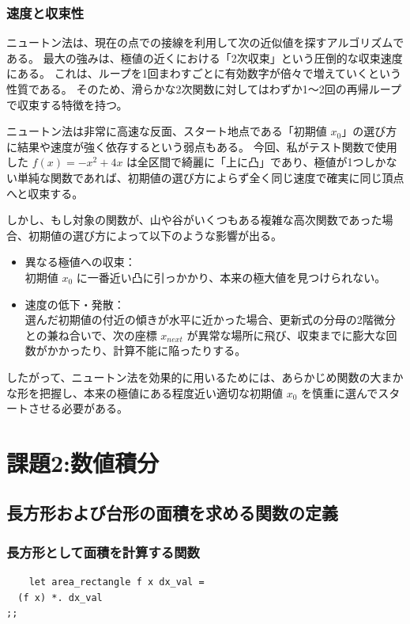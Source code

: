 \documentclass[titlepage]{ltjsarticle}
\begin{document}
\subsubsection{速度と収束性}
ニュートン法は、現在の点での接線を利用して次の近似値を探すアルゴリズムである。
最大の強みは、極値の近くにおける「2次収束」という圧倒的な収束速度にある。
これは、ループを1回まわすごとに有効数字が倍々で増えていくという性質である。
そのため、滑らかな2次関数に対してはわずか1〜2回の再帰ループで収束する特徴を持つ。
\par
ニュートン法は非常に高速な反面、スタート地点である「初期値 $x_0$」の選び方に結果や速度が強く依存するという弱点もある。
今回、私がテスト関数で使用した $f(x) = -x^2 + 4x$ は全区間で綺麗に「上に凸」であり、極値が1つしかない単純な関数であれば、初期値の選び方によらず全く同じ速度で確実に同じ頂点へと収束する。

しかし、もし対象の関数が、山や谷がいくつもある複雑な高次関数であった場合、初期値の選び方によって以下のような影響が出る。
\begin{itemize}
    \item 異なる極値への収束：\\
    初期値 $x_0$ に一番近い凸に引っかかり、本来の極大値を見つけられない。
    \item 速度の低下・発散：\\
    選んだ初期値の付近の傾きが水平に近かった場合、更新式の分母の2階微分との兼ね合いで、次の座標 $x_{next}$ が異常な場所に飛び、収束までに膨大な回数がかかったり、計算不能に陥ったりする。
\end{itemize}
したがって、ニュートン法を効果的に用いるためには、あらかじめ関数の大まかな形を把握し、本来の極値にある程度近い適切な初期値 $x_0$ を慎重に選んでスタートさせる必要がある。

\clearpage

\section{課題2:数値積分}
\subsection{長方形および台形の面積を求める関数の定義}
\subsubsection{長方形として面積を計算する関数}
\begin{verbatim}
    let area_rectangle f x dx_val = 
  (f x) *. dx_val
;;
\end{verbatim}
\end{document}
